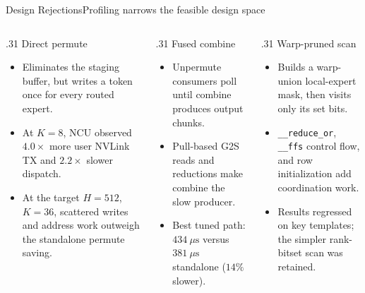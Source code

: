 \documentclass[aspectratio=169,10pt]{beamer}
\renewcommand{\NvidiaSource}[1]{}
\newcommand{\LocalSource}[1]{\NvidiaSource{\texttt{#1}}}
\begin{document}
\begin{frame}{Design Rejections}{Profiling narrows the feasible design space}
  \LocalSource{notes/direct\_permute\_ncu\_analysis.md; notes/isolated-scan-bench.md}
  \begin{columns}[T,onlytextwidth]
    \begin{column}{.31\textwidth}
      {\NvidiaSansMedium\color{NvidiaGreen}Direct permute}\par
      \vspace{.035in}
      \begin{itemize}\fontsize{7.5}{8.8}\selectfont\setlength{\itemsep}{.035in}\setlength{\parskip}{0pt}
        \item Eliminates the staging buffer, but writes a token once for every routed expert.
        \item At $K=8$, NCU observed $4.0\times$ more user NVLink TX and $2.2\times$ slower
          dispatch.
        \item At the target $H=512$, $K=36$, scattered writes and address work outweigh the
          standalone permute saving.
      \end{itemize}
    \end{column}
    \begin{column}{.31\textwidth}
      {\NvidiaSansMedium\color{NvidiaGreen}Fused combine}\par
      \vspace{.035in}
      \begin{itemize}\fontsize{7.5}{8.8}\selectfont\setlength{\itemsep}{.035in}\setlength{\parskip}{0pt}
        \item Unpermute consumers poll until combine produces output chunks.
        \item Pull-based G2S reads and reductions make combine the slow producer.
        \item Best tuned path: $434\ \mu\mathrm{s}$ versus $381\ \mu\mathrm{s}$ standalone
          ($14\%$ slower).
      \end{itemize}
    \end{column}
    \begin{column}{.31\textwidth}
      {\NvidiaSansMedium\color{NvidiaGreen}Warp-pruned scan}\par
      \vspace{.035in}
      \begin{itemize}\fontsize{7.5}{8.8}\selectfont\setlength{\itemsep}{.035in}\setlength{\parskip}{0pt}
        \item Builds a warp-union local-expert mask, then visits only its set bits.
        \item \texttt{\_\_reduce\_or}, \texttt{\_\_ffs} control flow, and row initialization add
          coordination work.
        \item Results regressed on key templates; the simpler rank-bitset scan was retained.
      \end{itemize}
    \end{column}
  \end{columns}
  \vspace{.14in}
\end{frame}
\end{document}
